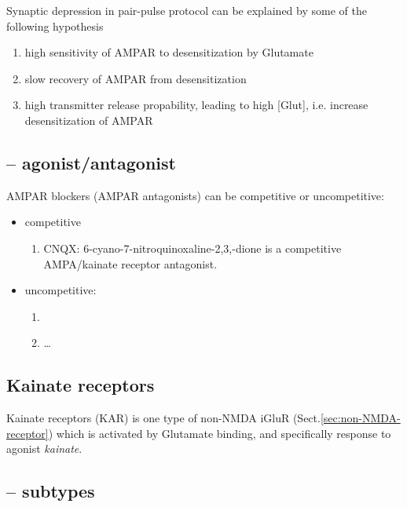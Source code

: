 Synaptic depression in pair-pulse protocol can be explained by some of the
following hypothesis
\begin{enumerate}
  \item high sensitivity of AMPAR to desensitization by Glutamate
  
  \item slow recovery of AMPAR from desensitization
  
  \item high transmitter release propability, leading to high [Glut], i.e.
  increase desensitization of AMPAR
\end{enumerate}




\subsection{-- agonist/antagonist}
\label{sec:AMPAR-antagonist}

AMPAR blockers (AMPAR antagonists) can be competitive or uncompetitive:
\begin{itemize}
  \item competitive
\begin{enumerate}
  \item CNQX: 6-cyano-7-nitroquinoxaline-2,3,-dione is a competitive
  AMPA/kainate receptor antagonist.
\end{enumerate}

  \item  uncompetitive: 
\begin{enumerate}
  \item  
  \item \ldots
\end{enumerate}
\end{itemize}

\subsection{Kainate receptors}
\label{sec:kainate_receptor}

Kainate receptors (KAR) is one type of non-NMDA iGluR
(Sect.\ref{sec:non-NMDA-receptor}) which is activated by Glutamate binding,  and
specifically response to agonist {\it kainate}.

\subsection{-- subtypes}
\label{sec:Kainate-receptor-subtypes}

